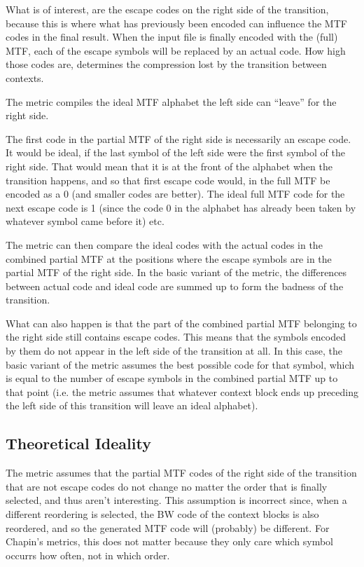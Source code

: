 \documentclass[a4paper]{scrreprt}
\begin{document}
What is of interest, are the escape codes on the right side of the transition,
because this is where what has previously been encoded can influence the MTF
codes in the final result. When the input file is finally encoded with the
(full) MTF, each of the escape symbols will be replaced by an actual code. How
high those codes are, determines the compression lost by the transition between
contexts.

The metric compiles the ideal MTF alphabet the left side can ``leave'' for the
right side.

The first code in the partial MTF of the right side is necessarily an escape
code. It would be ideal, if the last symbol of the left side were the first
symbol of the right side. That would mean that it is at the front of the
alphabet when the transition happens, and so that first escape code would, in
the full MTF be encoded as a 0 (and smaller codes are better). The ideal full
MTF code for the next escape code is 1 (since the code 0 in the alphabet has
already been taken by whatever symbol came before it) etc.

The metric can then compare the ideal codes with the actual codes in the
combined partial MTF at the positions where the escape symbols are in the
partial MTF of the right side. In the basic variant of the metric, the
differences between actual code and ideal code are summed up to form the badness
of the transition.

What can also happen is that the part of the combined partial MTF belonging to
the right side still contains escape codes. This means that the symbols encoded
by them do not appear in the left side of the transition at all. In this case,
the basic variant of the metric assumes the best possible code for that symbol,
which is equal to the number of escape symbols in the combined partial MTF up to
that point (i.e. the metric assumes that whatever context block ends up
preceding the left side of this transition will leave an ideal alphabet).

\subsection{Theoretical Ideality}

The metric assumes that the partial MTF codes of the right side of the
transition that are not escape codes do not change no matter the order that is
finally selected, and thus aren't interesting. This assumption is incorrect
since, when a different reordering is selected, the BW code of the context
blocks is also reordered, and so the generated MTF code will (probably) be
different. For Chapin's metrics, this does not matter because they only care
which symbol occurrs how often, not in which order.
\end{document}
